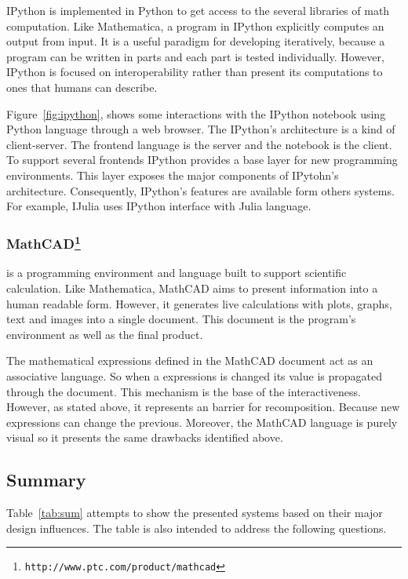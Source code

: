 IPython is implemented in Python to get access to the several libraries of math computation. Like Mathematica, a program in IPython explicitly computes an output from input. It is a useful paradigm for developing iteratively, because a program can be written in parts and each part is tested individually. However, IPython is focused on interoperability rather than present its computations to ones that humans can describe.


Figure~\ref{fig:ipython}, shows some interactions with the IPython notebook using Python language through a web browser. The IPython's architecture is a kind of client-server. The frontend language is the server and the notebook is the client. To support several frontends IPython provides a base layer for new programming environments. This layer exposes the major components of IPytohn's architecture. Consequently, IPython's features are available form others systems. For example, IJulia uses IPython interface with Julia language. 
\subsubsection{MathCAD\protect\footnote{\texttt{http://www.ptc.com/product/mathcad}}} is a programming environment and language built to support scientific calculation. Like Mathematica, MathCAD aims to present information into a human readable form. However, it generates live calculations with plots, graphs, text and images into a single document. This document is the program's environment as well as the final product.

The mathematical expressions defined in the MathCAD document act as an associative language. So when a expressions is changed its value is propagated through the document. This mechanism is the base of the interactiveness. However, as stated above, it represents an barrier for recomposition. Because new expressions can change the previous. Moreover, the MathCAD language is purely visual so it presents the same drawbacks identified above.

\subsection{Summary}

Table~\ref{tab:sum} attempts to show the presented systems based on their major design influences. The table is also intended to address the following questions.

